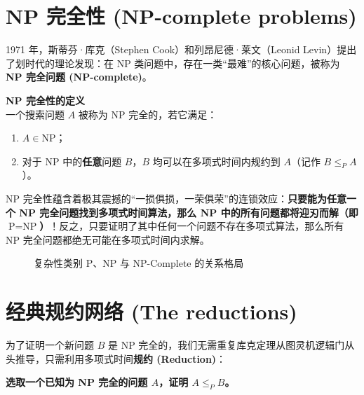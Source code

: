 \section{NP 完全性 (NP-complete problems)}

1971 年，斯蒂芬·库克（Stephen Cook）和列昂尼德·莱文（Leonid Levin）提出了划时代的理论发现：在 NP 类问题中，存在一类“最难”的核心问题，被称为 \textbf{NP 完全问题 (NP-complete)}。

\begin{tcolorbox}[colback=white,colframe=gray!50!black]
\textbf{NP 完全性的定义} \\
一个搜索问题 $A$ 被称为 NP 完全的，若它满足：
\begin{enumerate}
    \item $A \in \text{NP}$；
    \item 对于 NP 中的\textbf{任意}问题 $B$，$B$ 均可以在多项式时间内规约到 $A$（记作 $B \le_P A$）。
\end{enumerate}
\end{tcolorbox}

NP 完全性蕴含着极其震撼的“一损俱损，一荣俱荣”的连锁效应：\textbf{只要能为任意一个 NP 完全问题找到多项式时间算法，那么 NP 中的所有问题都将迎刃而解（即 $\text{P} = \text{NP}$）}！反之，只要证明了其中任何一个问题不存在多项式算法，那么所有 NP 完全问题都绝无可能在多项式时间内求解。

\begin{figure}[htbp]
\centering
{}
\caption{复杂性类别 P、NP 与 NP-Complete 的关系格局}
\label{fig:p_np_landscape}
\end{figure}

\section{经典规约网络 (The reductions)}

为了证明一个新问题 $B$ 是 NP 完全的，我们无需重复库克定理从图灵机逻辑门从头推导，只需利用多项式时间\textbf{规约 (Reduction)}：
\begin{center}
    \textbf{选取一个已知为 NP 完全的问题 $A$，证明 $A \le_P B$。}
\end{center}


